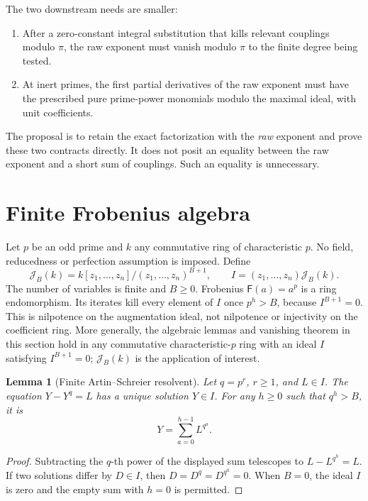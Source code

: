 \documentclass[11pt,letterpaper]{article}
\newtheorem{lemma}[theorem]{Lemma}
\theoremstyle{remark}
\newcommand{\JJ}{\mathcal J}
\newcommand{\FF}{\mathsf F}
\begin{document}
The two downstream needs are smaller:
\begin{enumerate}
\item After a zero-constant integral substitution that kills relevant couplings
modulo \(\pi\), the raw exponent must vanish modulo \(\pi\) to the finite
degree being tested.
\item At inert primes, the first partial derivatives of the raw exponent must
have the prescribed pure prime-power monomials modulo the maximal ideal, with
unit coefficients.
\end{enumerate}
The proposal is to retain the exact factorization with the \emph{raw} exponent
and prove these two contracts directly. It does not posit an equality between
the raw exponent and a short sum of couplings. Such an equality is unnecessary.

\section{Finite Frobenius algebra}
\label{sec:algebra}

Let \(p\) be an odd prime and \(k\) any commutative ring of characteristic
\(p\). No field, reducedness or perfection assumption is imposed. Define
\[
 \JJ_B(k)=k[z_1,\ldots,z_n]/(z_1,\ldots,z_n)^{B+1},\qquad
 I=(z_1,\ldots,z_n)\JJ_B(k).
\]
The number of variables is finite and \(B\ge0\). Frobenius
\(\FF(a)=a^p\) is a ring endomorphism. Its iterates kill every element of
\(I\) once \(p^h>B\), because \(I^{B+1}=0\). This is nilpotence on the
augmentation ideal, not nilpotence or injectivity on the coefficient ring.
More generally, the algebraic lemmas and vanishing theorem in this section hold
in any commutative characteristic-\(p\) ring with an ideal \(I\) satisfying
\(I^{B+1}=0\); \(\JJ_B(k)\) is the application of interest.

\begin{lemma}[Finite Artin--Schreier resolvent]
\label{lem:resolvent}
Let \(q=p^r\), \(r\ge1\), and \(L\in I\). The equation
\(Y-Y^q=L\) has a unique solution \(Y\in I\). For any \(h\ge0\) such that
\(q^h>B\), it is
\begin{equation}
 Y=\sum_{a=0}^{h-1}L^{q^a}. \label{eq:resolvent}
\end{equation}
\end{lemma}
\begin{proof}
Subtracting the \(q\)-th power of the displayed sum telescopes to
\(L-L^{q^h}=L\). If two solutions differ by \(D\in I\), then
\(D=D^q=D^{q^h}=0\). When \(B=0\), the ideal \(I\) is zero and the empty
sum with \(h=0\) is permitted.
\end{proof}
\end{document}
